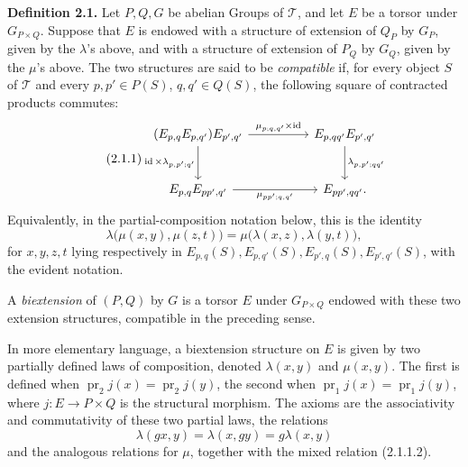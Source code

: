 \documentclass[11pt]{article}
\providecommand{\pr}{\operatorname{pr}}
\providecommand{\id}{\operatorname{id}}
\providecommand{\id}{\mathrm{id}}
\begin{document}
\textbf{Definition 2.1.}  Let \(P,Q,G\) be abelian Groups of \(\mathcal T\), and let \(E\) be a torsor under \(G_{P\times Q}\).  Suppose that \(E\) is endowed with a structure of extension of \(Q_P\) by \(G_P\), given by the \(\lambda\)'s above, and with a structure of extension of \(P_Q\) by \(G_Q\), given by the \(\mu\)'s above.  The two structures are said to be \emph{compatible} if, for every object \(S\) of \(\mathcal T\) and every \(p,p'\in P(S)\), \(q,q'\in Q(S)\), the following square of contracted products commutes:
\begin{equation}\tag{2.1.1}
\begin{tikzcd}[column sep=huge,row sep=large]
(E_{p,q}E_{p,q'})E_{p',q'}
\arrow[r,"\mu_{p;q,q'}\times\id"]
\arrow[d,"\id\times\lambda_{p,p';q'}"']
& E_{p,qq'}E_{p',q'}\arrow[d,"\lambda_{p,p';qq'}"]\\
E_{p,q}E_{pp',q'}\arrow[r,"\mu_{pp';q,q'}"']&E_{pp',qq'} .
\end{tikzcd}
\end{equation}
Equivalently, in the partial-composition notation below, this is the identity
\begin{equation}\tag{2.1.1.2}
  \lambda\bigl(\mu(x,y),\mu(z,t)\bigr)
  =
  \mu\bigl(\lambda(x,z),\lambda(y,t)\bigr),
\end{equation}
for \(x,y,z,t\) lying respectively in \(E_{p,q}(S),E_{p,q'}(S),E_{p',q}(S),E_{p',q'}(S)\), with the evident notation.

A \emph{biextension} of \((P,Q)\) by \(G\) is a torsor \(E\) under \(G_{P\times Q}\) endowed with these two extension structures, compatible in the preceding sense.

In more elementary language, a biextension structure on \(E\) is given by two partially defined laws of composition, denoted \(\lambda(x,y)\) and \(\mu(x,y)\).  The first is defined when \(\pr_2 j(x)=\pr_2 j(y)\), the second when \(\pr_1 j(x)=\pr_1 j(y)\), where \(j:E\to P\times Q\) is the structural morphism.  The axioms are the associativity and commutativity of these two partial laws, the relations
\begin{equation}\tag{2.1.1.1}
  \lambda(gx,y)=\lambda(x,gy)=g\lambda(x,y)
\end{equation}
and the analogous relations for \(\mu\), together with the mixed relation (2.1.1.2).
\end{document}
